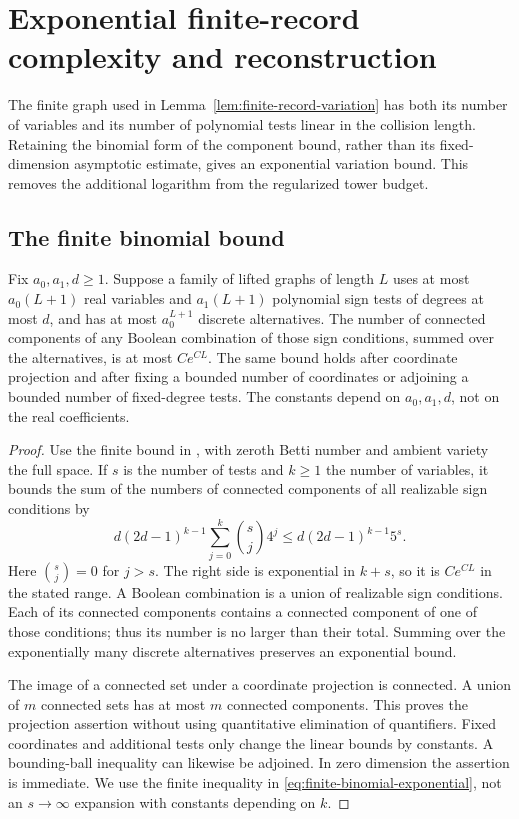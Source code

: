 \section{Exponential finite-record complexity and reconstruction}
\label{sec:exponential-reconstruction}
The finite graph used in Lemma~\ref{lem:finite-record-variation}
has both its number of variables and its number of polynomial tests
linear in the collision length. Retaining the binomial form of the
component bound, rather than its fixed-dimension asymptotic estimate,
gives an exponential variation bound. This removes the additional
logarithm from the regularized tower budget.

\subsection{The finite binomial bound}
\begin{lemma}
\label{lem:linear-sign-complexity}
Fix $a_0,a_1,d\ge1$. Suppose a family of lifted graphs of length $L$
uses at most $a_0(L+1)$ real variables and $a_1(L+1)$ polynomial
sign tests of degrees at most $d$, and has at most $a_0^{L+1}$
discrete alternatives. The number of connected components of any
Boolean combination of those sign conditions, summed over the
alternatives, is at most $C e^{CL}$. The same bound holds after
coordinate projection and after fixing a bounded number of coordinates
or adjoining a bounded number of fixed-degree tests. The constants
depend on $a_0,a_1,d$, not on the real coefficients.
\end{lemma}
\begin{proof}
Use the finite bound in \cite[Section 3.2, (3.3)]{BPR}, with zeroth
Betti number and ambient variety the full space. If $s$ is the number
of tests and $k\ge1$ the number of variables, it bounds the sum of
the numbers of connected components of all realizable sign conditions
by
\begin{equation}\label{eq:finite-binomial-exponential}
 d(2d-1)^{k-1}\sum_{j=0}^{k}\binom{s}{j}4^j
 \le d(2d-1)^{k-1}5^s.
\end{equation}
Here $\binom{s}{j}=0$ for $j>s$. The right side is exponential in
$k+s$, so it is $Ce^{CL}$ in the stated range. A Boolean combination
is a union of realizable sign conditions. Each of its connected
components contains a connected component of one of those conditions;
thus its number is no larger than their total. Summing over the
exponentially many discrete alternatives preserves an exponential bound.

The image of a connected set under a coordinate projection is connected.
A union of $m$ connected sets has at most $m$ connected components.
This proves the projection assertion without using quantitative
elimination of quantifiers. Fixed coordinates and additional tests
only change the linear bounds by constants. A bounding-ball inequality
can likewise be adjoined. In zero dimension the assertion is immediate.
We use the finite inequality in \eqref{eq:finite-binomial-exponential},
not an $s\to\infty$ expansion with constants depending on $k$.
\end{proof}

